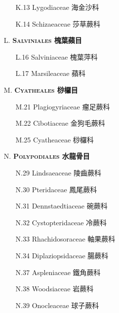 \begin{enumerate}
    \begin{enumerate}
      \item[K.13] Lygodiaceae 海金沙科   
        
      \item[K.14] Schizaeaceae 莎草蕨科   
        
    \end{enumerate}
  \item[L. ] \textbf{\textsc{Salviniales} 槐葉蘋目} 
    \begin{enumerate}
      \item[L.16] Salviniaceae 槐葉萍科   
        
      \item[L.17] Marsileaceae 蘋科   
        
    \end{enumerate}
  \item[M. ] \textbf{\textsc{Cyatheales} 桫欏目} 
    \begin{enumerate}
      \item[M.21] Plagiogyriaceae 瘤足蕨科   
        
      \item[M.22] Cibotiaceae 金狗毛蕨科   
        
      \item[M.25] Cyatheaceae 桫欏科   
        
    \end{enumerate}
  \item[N. ] \textbf{\textsc{Polypodiales} 水龍骨目} 
    \begin{enumerate}
      \item[N.29] Lindsaeaceae 陵齒蕨科   
        
      \item[N.30] Pteridaceae 鳳尾蕨科   
        
      \item[N.31] Dennstaedtiaceae 碗蕨科   
        
      \item[N.32] Cystopteridaceae 冷蕨科   
        
      \item[N.33] Rhachidosoraceae 軸果蕨科   
        
      \item[N.34] Diplaziopsidaceae 腸蕨科   
        
      \item[N.37] Aspleniaceae 鐵角蕨科   
        
      \item[N.38] Woodsiaceae 岩蕨科   
        
      \item[N.39] Onocleaceae 球子蕨科   
        

\end{enumerate}
\end{enumerate}
